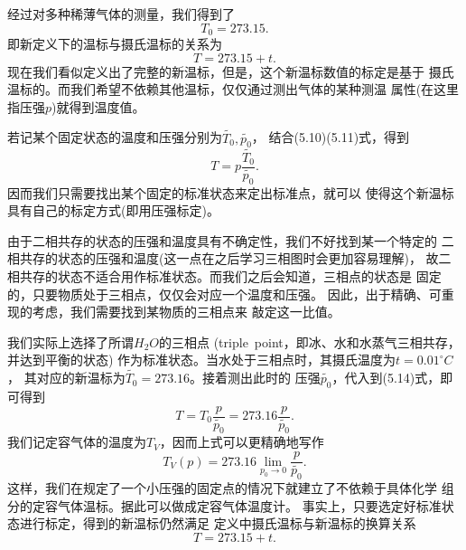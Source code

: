 经过对多种稀薄气体的测量，我们得到了
\begin{equation}
    T_0=273.15.
\end{equation}
即新定义下的温标与摄氏温标的关系为
\begin{equation}
    T=273.15+t.
\end{equation}
现在我们看似定义出了完整的新温标，但是，这个新温标数值的标定是基于
摄氏温标的。而我们希望不依赖其他温标，仅仅通过测出气体的某种测温
属性(在这里指压强$p$)就得到温度值。

若记某个固定状态的温度和压强分别为$\widetilde{T_0},\widetilde{p_0}$，
结合(5.10)(5.11)式，得到 
\begin{equation}
    T=p\frac{\widetilde{T_0}}{\widetilde{p_0}}.
\end{equation}
因而我们只需要找出某个固定的标准状态来定出标准点，就可以
使得这个新温标具有自己的标定方式(即用压强标定)。

由于二相共存的状态的压强和温度具有不确定性，我们不好找到某一个特定的
二相共存的状态的压强和温度(这一点在之后学习三相图时会更加容易理解)，
故二相共存的状态不适合用作标准状态。而我们之后会知道，三相点的状态是
固定的，只要物质处于三相点，仅仅会对应一个温度和压强。
因此，出于精确、可重现的考虑，我们需要找到某物质的三相点来
敲定这一比值。

我们实际上选择了所谓$H_2O$的三相点
(triple~point，即冰、水和水蒸气三相共存，并达到平衡的状态)
作为标准状态。当水处于三相点时，其摄氏温度为$t=0.01^{\circ}C$，
其对应的新温标为$\widetilde{T_0}=273.16$。接着测出此时的
压强$\widetilde{p_0}$，代入到(5.14)式，即可得到
\begin{equation}
    T=T_0\frac{p}{\widetilde{p_0}}=273.16\frac{p}{\widetilde{p_0}}.
\end{equation}
我们记定容气体的温度为$T_V$，因而上式可以更精确地写作
\begin{equation}
    T_V(p)=273.16\lim \limits_{p_0\rightarrow 0}\frac{p}{\widetilde{p_0}}.
\end{equation}
这样，我们在规定了一个小压强的固定点的情况下就建立了不依赖于具体化学
组分的定容气体温标。据此可以做成定容气体温度计。
事实上，只要选定好标准状态进行标定，得到的新温标仍然满足
定义中摄氏温标与新温标的换算关系
\begin{equation}
    T=273.15+t.
\end{equation}

